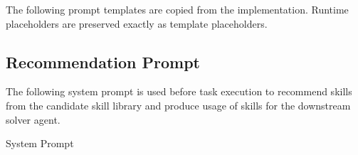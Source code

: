 
The following prompt templates are copied from the implementation. Runtime placeholders are preserved exactly as template placeholders.

\subsection{Recommendation Prompt}


\noindent The following system prompt is used before task execution to recommend skills from the candidate skill library and produce usage of skills for the downstream solver agent.\par

\begin{svpromptbox}{System Prompt}


\end{svpromptbox}
